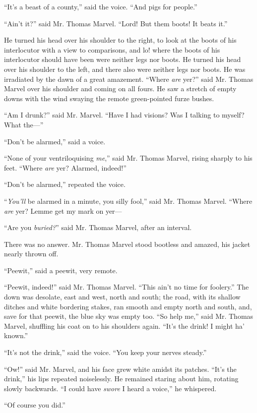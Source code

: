 “It’s a beast of a county,” said the voice. “And pigs for people.”

“Ain’t it?” said Mr. Thomas Marvel. “Lord! But them boots! It beats it.”

He turned his head over his shoulder to the right, to look at the boots of his interlocutor with a view to comparisons, and lo! where the boots of his interlocutor should have been were neither legs nor boots. He turned his head over his shoulder to the left, and there also were neither legs nor boots. He was irradiated by the dawn of a great amazement. “Where \emph{are} yer?” said Mr. Thomas Marvel over his shoulder and coming on all fours. He saw a stretch of empty downs with the wind swaying the remote green-pointed furze bushes.

“Am I drunk?” said Mr. Marvel. “Have I had visions? Was I talking to myself? What the—”

“Don’t be alarmed,” said a voice.

“None of your ventriloquising \emph{me},” said Mr. Thomas Marvel, rising sharply to his feet. “Where \emph{are} yer? Alarmed, indeed!”

“Don’t be alarmed,” repeated the voice.

“\emph{You’ll} be alarmed in a minute, you silly fool,” said Mr. Thomas Marvel. “Where \emph{are} yer? Lemme get my mark on yer—

“Are you \emph{buried?}” said Mr. Thomas Marvel, after an interval.

There was no answer. Mr. Thomas Marvel stood bootless and amazed, his jacket nearly thrown off.

“Peewit,” said a peewit, very remote.

“Peewit, indeed!” said Mr. Thomas Marvel. “This ain’t no time for foolery.” The down was desolate, east and west, north and south; the road, with its shallow ditches and white bordering stakes, ran smooth and empty north and south, and, save for that peewit, the blue sky was empty too. “So help me,” said Mr. Thomas Marvel, shuffling his coat on to his shoulders again. “It’s the drink! I might ha’ known.”

“It’s not the drink,” said the voice. “You keep your nerves steady.”

“Ow!” said Mr. Marvel, and his face grew white amidst its patches. “It’s the drink,” his lips repeated noiselessly. He remained staring about him, rotating slowly backwards. “I could have \emph{swore} I heard a voice,” he whispered.

“Of course you did.”

